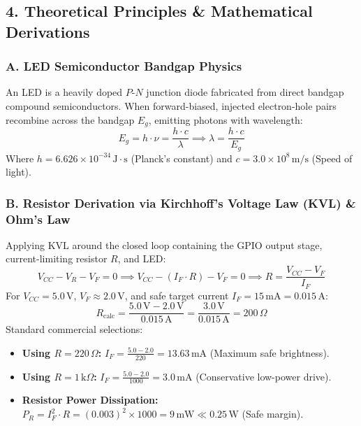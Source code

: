 \documentclass[11pt,a4paper]{article}
\begin{document}
\subsection*{4. Theoretical Principles \& Mathematical Derivations}

\subsubsection*{A. LED Semiconductor Bandgap Physics}
An LED is a heavily doped $P$-$N$ junction diode fabricated from direct bandgap compound semiconductors. When forward-biased, injected electron-hole pairs recombine across the bandgap $E_g$, emitting photons with wavelength:
\begin{equation}
E_g = h \cdot \nu = \frac{h \cdot c}{\lambda} \implies \lambda = \frac{h \cdot c}{E_g}
\end{equation}
Where $h = 6.626 \times 10^{-34}\,\text{J}\cdot\text{s}$ (Planck's constant) and $c = 3.0 \times 10^8\,\text{m/s}$ (Speed of light).

\subsubsection*{B. Resistor Derivation via Kirchhoff's Voltage Law (KVL) \& Ohm's Law}
Applying KVL around the closed loop containing the GPIO output stage, current-limiting resistor $R$, and LED:
\begin{equation}
V_{CC} - V_R - V_F = 0 \implies V_{CC} - (I_F \cdot R) - V_F = 0 \implies R = \frac{V_{CC} - V_F}{I_F}
\end{equation}
For $V_{CC} = 5.0\,\text{V}$, $V_F \approx 2.0\,\text{V}$, and safe target current $I_F = 15\,\text{mA} = 0.015\,\text{A}$:
\begin{equation}
R_{\text{calc}} = \frac{5.0\,\text{V} - 2.0\,\text{V}}{0.015\,\text{A}} = \frac{3.0\,\text{V}}{0.015\,\text{A}} = 200\,\Omega
\end{equation}
Standard commercial selections:
\begin{itemize}[noitemsep]
    \item \textbf{Using $R = 220\,\Omega$:} $I_F = \frac{5.0 - 2.0}{220} = 13.63\,\text{mA}$ (Maximum safe brightness).
    \item \textbf{Using $R = 1\,\text{k}\Omega$:} $I_F = \frac{5.0 - 2.0}{1000} = 3.0\,\text{mA}$ (Conservative low-power drive).
    \item \textbf{Resistor Power Dissipation:} $P_R = I_F^2 \cdot R = (0.003)^2 \times 1000 = 9\,\text{mW} \ll 0.25\,\text{W}$ (Safe margin).
\end{itemize}
\end{document}
